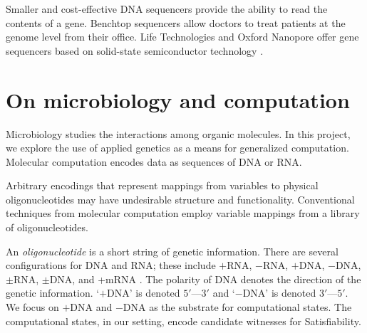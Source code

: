 Smaller and cost-effective DNA sequencers provide the ability to read the contents of a gene.  Benchtop sequencers \cite{ionTorrent, oxfordNanopore} allow doctors to treat patients at the genome level from their office.  Life Technologies and Oxford Nanopore offer gene sequencers based on solid-state semiconductor technology \cite{ionTorrent, oxfordNanopore}.	

\section{On microbiology and computation}

	Microbiology studies the interactions among organic molecules.  In this project, we explore the use of applied genetics as a means for generalized computation.  Molecular computation encodes data as sequences of DNA or RNA.  

	Arbitrary encodings that represent mappings from variables to physical oligonucleotides may have undesirable structure and functionality.  Conventional techniques from molecular computation employ variable mappings from a library of oligonucleotides.
	
		

	
	An \textit{oligonucleotide} is a short string of genetic information.  There are several configurations for DNA and RNA; these include $+$RNA, $-$RNA, $+$DNA, $-$DNA, $\pm$RNA, $\pm$DNA, and +mRNA \cite{baltimore1971exp}.  The polarity of DNA denotes the direction of the genetic information.  `$+$DNA' is denoted $5'$---$3'$ and `$-$DNA' is denoted $3'$---$5'$.  We focus on $+$DNA and $-$DNA as the substrate for computational states.  The computational states, in our setting, encode candidate witnesses for {\sc Satisfiability}.


